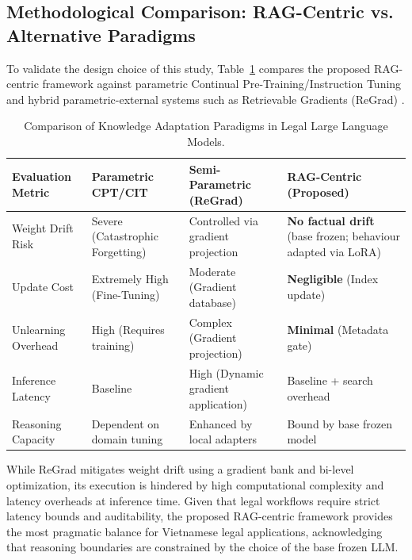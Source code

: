 \subsection{Methodological Comparison: RAG-Centric vs. Alternative Paradigms}
To validate the design choice of this study, Table~\ref{tab:methodology_comparison} compares the proposed RAG-centric framework against parametric Continual Pre-Training/Instruction Tuning and hybrid parametric-external systems such as Retrievable Gradients (ReGrad) \parencite{su2026retrievablegradientscontinualposttraining}.

\begin{table}[H]
\centering
\small
\setlength{\tabcolsep}{4pt}
\renewcommand{\arraystretch}{1.15}
\caption{Comparison of Knowledge Adaptation Paradigms in Legal Large Language Models.}
\label{tab:methodology_comparison}
\begin{tabularx}{\textwidth}{>{\raggedright\arraybackslash}p{2.5cm} >{\raggedright\arraybackslash}X >{\raggedright\arraybackslash}X >{\raggedright\arraybackslash}X}
\hline
\textbf{Evaluation Metric} & \textbf{Parametric CPT/CIT} & \textbf{Semi-Parametric (ReGrad)} & \textbf{RAG-Centric (Proposed)} \\
\hline
Weight Drift Risk & Severe (Catastrophic Forgetting) & Controlled via gradient projection & \textbf{No factual drift} (base frozen; behaviour adapted via LoRA) \\
Update Cost & Extremely High (Fine-Tuning) & Moderate (Gradient database) & \textbf{Negligible} (Index update) \\
Unlearning Overhead & High (Requires training) & Complex (Gradient projection) & \textbf{Minimal} (Metadata gate) \\
Inference Latency & Baseline & High (Dynamic gradient application) & Baseline + search overhead \\
Reasoning Capacity & Dependent on domain tuning & Enhanced by local adapters & Bound by base frozen model \\
\hline
\end{tabularx}
\end{table}

While ReGrad \parencite{su2026retrievablegradientscontinualposttraining} mitigates weight drift using a gradient bank and bi-level optimization, its execution is hindered by high computational complexity and latency overheads at inference time. Given that legal workflows require strict latency bounds and auditability, the proposed RAG-centric framework provides the most pragmatic balance for Vietnamese legal applications, acknowledging that reasoning boundaries are constrained by the choice of the base frozen LLM.

